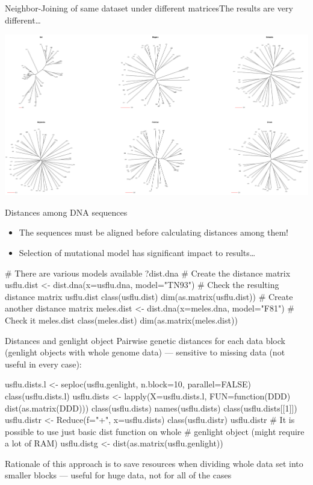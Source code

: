 \documentclass[compress, ucs, xelatex, 11pt, xcolor=svgnames,
	hyperref={
		bookmarks=true,
		unicode=true,
		colorlinks=true,
		pdftitle={Molecular data in R},
		plainpages=false,
		pdfauthor={Vojtech Zeisek},
		pdfsubject={Course about phylogeny and evolution in R},
		pdfcreator={XeLaTeX},
		pdfkeywords={R, evolution, phylogeny, molecular data},
		linkcolor=Tomato,
		anchorcolor=SaddleBrown,
		citecolor=Goldenrod,
		filecolor=DarkMagenta,
		menucolor=Sienna,
		urlcolor=DarkTurquoise,
		pdftex},
	url={hyphens, lowtilde} %
	]{beamer}
\begin{document}
\begin{frame}{Neighbor-Joining of same dataset under different matrices}{The results are very different\ldots}
	\begin{center}
		\includegraphics[width=\textwidth]{distances.png}
	\end{center}
\end{frame}

\begin{frame}[fragile]{Distances among DNA sequences}
	\begin{itemize}
		\item \alert{The sequences must be aligned before calculating distances among them!}
		\item Selection of mutational model has significant impact to results\ldots
	\end{itemize}
	\vfill
	\begin{spluscode}
    # There are various models available
    ?dist.dna
    # Create the distance matrix
    usflu.dist <- dist.dna(x=usflu.dna, model="TN93")
    # Check the resulting distance matrix
    usflu.dist
    class(usflu.dist)
    dim(as.matrix(usflu.dist))
    # Create another distance matrix
    meles.dist <- dist.dna(x=meles.dna, model="F81")
    # Check it
    meles.dist
    class(meles.dist)
    dim(as.matrix(meles.dist))
	\end{spluscode}
\end{frame}

\begin{frame}[fragile]{Distances and genlight object}
	\vfill
	Pairwise genetic distances for each data block (genlight objects with whole genome data) --- sensitive to missing data (not useful in every case):
	\vfill
	\begin{spluscode}
    usflu.dists.l <- seploc(usflu.genlight, n.block=10, parallel=FALSE)
    class(usflu.dists.l)
    usflu.dists <- lapply(X=usflu.dists.l, FUN=function(DDD)
      dist(as.matrix(DDD)))
    class(usflu.dists)
    names(usflu.dists)
    class(usflu.dists[[1]])
    usflu.distr <- Reduce(f="+", x=usflu.dists)
    class(usflu.distr)
    usflu.distr
    # It is possible to use just basic dist function on whole
    # genlight object (might require a lot of RAM)
    usflu.distg <- dist(as.matrix(usflu.genlight))
	\end{spluscode}
	\vfil
	Rationale of this approach is to save resources when dividing whole data set into smaller blocks --- useful for huge data, not for all of the cases
	\vfill
\end{frame}
\end{document}
